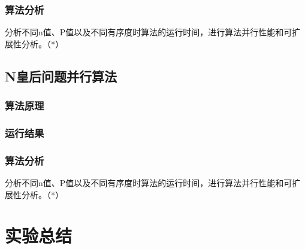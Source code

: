 \documentclass[10pt]{article}
\begin{document}
\subsubsection{算法分析}
分析不同n值、P值以及不同有序度时算法的运行时间，进行算法并行性能和可扩展性分析。（*）

\subsection{N皇后问题并行算法}

\subsubsection{算法原理}

\subsubsection{运行结果}

\subsubsection{算法分析}
分析不同n值、P值以及不同有序度时算法的运行时间，进行算法并行性能和可扩展性分析。（*）

\section{实验总结}
\end{document}
